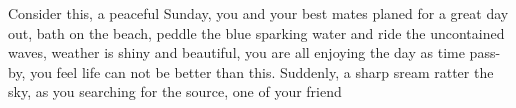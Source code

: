 Consider this, a peaceful Sunday, you and your best mates planed for a great day out, bath on the beach, peddle the blue sparking water and ride the uncontained waves, weather is shiny and beautiful, you are all enjoying the day as time pass-by, you feel life can not be better than this. Suddenly, a sharp sream ratter the sky, as you searching for the source, one of your friend